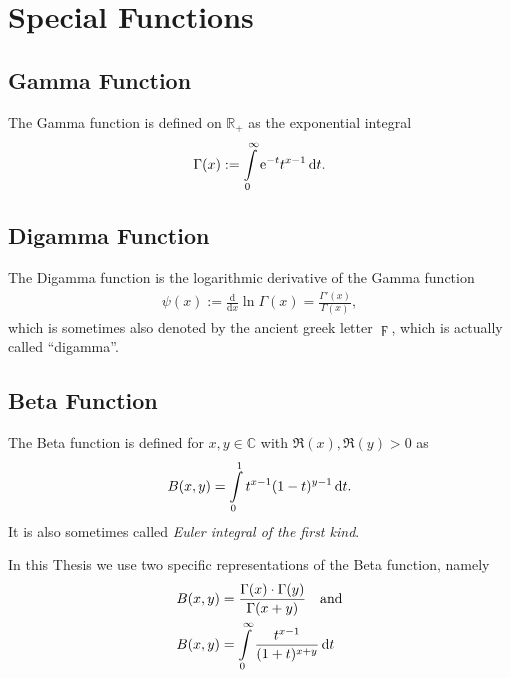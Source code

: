 \section{Special Functions}
\subsection{Gamma Function}
The Gamma function is defined on $\mathbb{R}_{+}$ as the exponential integral
\begin{align}
    \Gamma(x) := \Integ[\infty]{0}{t}{\Eto{-t}t^{x-1}}.
    \label{def:gamma}
\end{align}

\subsection{Digamma Function}
The Digamma function is the logarithmic derivative of the Gamma function
\begin{align}
    \psi(x) := \frac{\mathrm d}{\mathrm dx}\ln{\Gamma(x)}
            = \frac{\Gamma'(x)}{\Gamma(x)},
    \label{def:digamma}
\end{align}
which is sometimes also denoted by the ancient greek letter $\digamma$, which is
actually called ``digamma''.
\subsection{Beta Function}
The Beta function is defined for $x,y\in\mathbb{C}$ with $\Re(x),\Re(y) > 0$ as
\begin{align}
    B(x,y) = \Integ[1]{0}{t}{t^{x-1}(1-t)^{y-1}}.
    \label{def:beta}
\end{align}
It is also sometimes called \textit{Euler integral of the first kind}.

In this Thesis we use two specific representations of the Beta function, namely
\begin{align}
    B(x, y) &= \frac{\Gamma(x)\cdot\Gamma(y)}{\Gamma(x+y)} \quad \text{and}
    \label{frm:beta_rep1} \\
    B(x, y) &= \Integ[\infty]{0}{t}{\frac{t^{x-1}}{(1 + t)^{x+y}}}
    \label{frm:beta_rep2}
\end{align}

